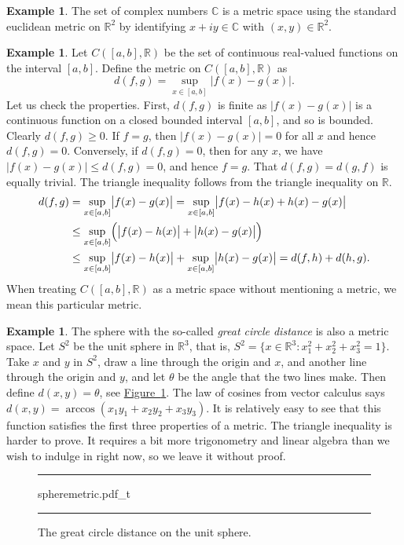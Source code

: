 \documentclass[12pt,openany]{book}
\newcommand{\glsadd}[2][]{}
\newcommand{\babs}[1]{\bigl\lvert {#1} \bigr\rvert}
\newcommand{\abs}[1]{\left\lvert {#1} \right\rvert}
\newcommand{\C}{{\mathbb{C}}}
\newcommand{\R}{{\mathbb{R}}}
\newcommand{\myindex}[1]{#1\index{#1}}
\theoremstyle{plain}
\theoremstyle{remark}
\theoremstyle{definition}
\newenvironment{myfig}{%
\begin{figure}[h!t]
\noindent\rule{\textwidth}{0.5pt}\vspace{12pt}\par\centering}%
{\par\noindent\rule{\textwidth}{0.5pt}
\end{figure}}
\theoremstyle{exercise}
\theoremstyle{example}
\newtheorem{example}[thm]{Example}
\newcommand{\figureref}[1]{\hyperref[#1]{Figure~\ref*{#1}}}
\begin{document}
\begin{example} \label{example:mscomplex}
The set of complex numbers $\C$ is a metric space using the standard
euclidean metric on $\R^2$
by identifying $x+iy \in \C$ with $(x,y) \in \R^2$.
\end{example}

\begin{example} \label{example:msC01}
Let $C([a,b],\R)$\glsadd{not:contfuncs} be the set of continuous real-valued functions on the
interval $[a,b]$.  Define the metric on $C([a,b],\R)$ as
\begin{equation*}
d(f,g) = \sup_{x \in [a,b]} \abs{f(x)-g(x)} .
\end{equation*}
Let us check the properties.  First, $d(f,g)$ is finite as
$\babs{f(x)-g(x)}$ is a continuous function on a closed bounded interval
$[a,b]$, and so is bounded.
Clearly $d(f,g) \geq 0$. 
If $f = g$,
then $\abs{f(x)-g(x)} = 0$ for all $x$ and hence $d(f,g) = 0$.  Conversely,
if $d(f,g) = 0$, then for any $x$, we have $\abs{f(x)-g(x)} \leq d(f,g) = 0$,
and hence $f=g$.  That $d(f,g) = d(g,f)$
is equally trivial.  The triangle inequality follows from the 
triangle inequality on $\R$.
\begin{equation*}
\begin{split}
d(f,g) & =
\sup_{x \in [a,b]} \babs{f(x)-g(x)} =
\sup_{x \in [a,b]} \babs{f(x)-h(x)+h(x)-g(x)}
\\
& \leq
\sup_{x \in [a,b]} \Bigl( \babs{f(x)-h(x)}+\babs{h(x)-g(x)} \Bigr)
\\
& \leq
\sup_{x \in [a,b]} \babs{f(x)-h(x)}+
\sup_{x \in [a,b]} \babs{h(x)-g(x)} = d(f,h) + d(h,g) .
\end{split}
\end{equation*}
When treating $C([a,b],\R)$ as a metric space without mentioning a metric, we mean this
particular metric.
\end{example}

\begin{example} \label{ms:greatcircle}
The sphere with the so-called
\emph{\myindex{great circle distance}} is also a metric space.
Let $S^2$ be the \myindex{unit sphere} in $\R^3$,
that is, $S^2 = \bigl\{ x \in \R^3 : x_1^2+x_2^2+x_3^2 = 1 \bigr\}$.
Take $x$ and $y$ in $S^2$, draw a line through the origin and $x$,
and another line through the origin and $y$,
and let $\theta$ be the angle that the two lines make.
Then define $d(x,y) = \theta$, see \figureref{fig:spheremetric}.
The law of cosines from vector calculus says
$d(x,y) = \arccos(x_1y_1+x_2y_2+x_3y_3)$.
It is relatively easy to see that this function satisfies the first three
properties of a metric.
The triangle inequality is harder to prove.  It requires a bit more
trigonometry and linear algebra than we wish to indulge in right now,
so we leave it without proof.
\begin{myfig}
{spheremetric.pdf_t}
\caption{The great circle distance on the unit sphere.\label{fig:spheremetric}}
\end{myfig}
\end{example}
\end{document}

